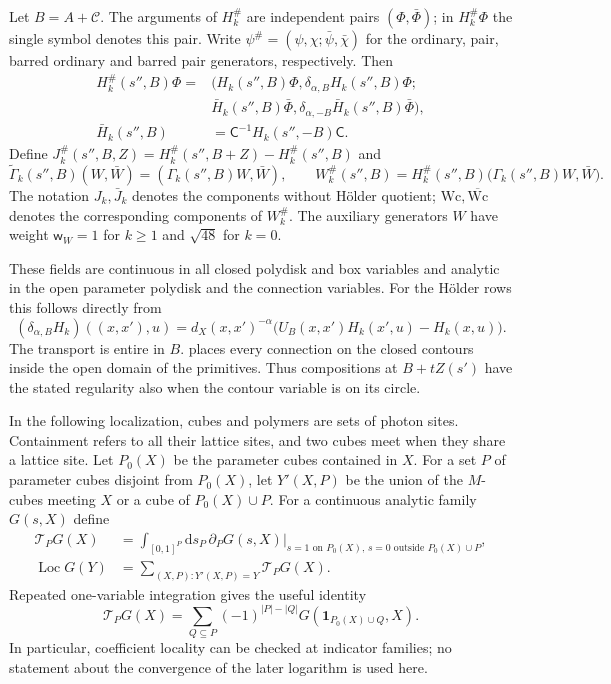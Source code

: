 \documentclass[11pt,letterpaper,reqno]{amsart}
\newcommand{\dd}{\mathrm d}
\begin{document}
Let $B=A+\mathscr C$.
The arguments of $H_k^\#$ are independent pairs
$(\Phi,\bar\Phi)$; in $H_k^\#\Phi$ the single symbol denotes
this pair. Write
$\psi^\#=(\psi,\chi;\bar\psi,\bar\chi)$ for the ordinary,
pair, barred ordinary and barred pair generators, respectively.
Then
\[
 \begin{aligned}
 H_k^\#(s'',B)\Phi
   ={}&(H_k(s'',B)\Phi,\delta_{\alpha,B}H_k(s'',B)\Phi;\\
       &
       \bar H_k(s'',B)\bar\Phi,
                       \delta_{\alpha,-B}\bar H_k(s'',B)\bar\Phi),\\
 \bar H_k(s'',B)&=\mathsf C^{-1}H_k(s'',-B)\mathsf C.
 \end{aligned}
\]
Define
$J_k^\#(s'',B,Z)=H_k^\#(s'',B+Z)-H_k^\#(s'',B)$ and
\[
 \widetilde\Gamma_k(s'',B)(W,\bar W)
                         =(\Gamma_k(s'',B)W,\bar W),\qquad
 W_k^\#(s'',B)=H_k^\#(s'',B)
                         \big(\Gamma_k(s'',B)W,\bar W\big).
\]
The notation $J_k,\bar J_k$ denotes the components without
H\"older quotient; $\mathrm{Wc},\overline{\mathrm{Wc}}$ denotes
the corresponding components of $W_k^\#$.
The auxiliary generators $W$ have weight
$\mathsf w_W=1$ for $k\ge1$ and $\sqrt{48}$ for $k=0$.

These fields are continuous in all closed polydisk and box
variables and analytic in the open parameter polydisk and the
connection variables. For the H\"older rows this follows
directly from
\[
 (\delta_{\alpha,B}H_k)((x,x'),u)
   =d_X(x,x')^{-\alpha}
       \big(U_B(x,x')H_k(x',u)-H_k(x,u)\big).
\]
The transport is entire in $B$. 
places every connection on the closed contours inside the
open domain of the primitives. Thus compositions at
$B+tZ(s')$ have the stated regularity also when the contour
variable is on its circle.

In the following localization, cubes and polymers are sets
of photon sites. Containment refers to all their lattice sites,
and two cubes meet when they share a lattice site.
Let $P_0(X)$ be the parameter cubes contained in $X$.
For a set $P$ of parameter cubes disjoint from $P_0(X)$, let $Y'(X,P)$ be the union of
the $M$-cubes meeting $X$ or a cube of $P_0(X)\cup P$.
For a continuous analytic family $G(s,X)$ define
\begin{align}
 \mathcal T_PG(X)
  &=\int_{[0,1]^P}\dd s_P\,
       \partial_PG(s,X)
       \big|_{s=1\text{ on }P_0(X),\,
                    s=0\text{ outside }P_0(X)\cup P},
                          \label{eq:rgnl-interpolation}\\
 \operatorname{Loc}G(Y)
  &=\sum_{(X,P):Y'(X,P)=Y}\mathcal T_PG(X).
                          \label{eq:rgnl-localization}
\end{align}
Repeated one-variable integration gives the useful identity
\begin{equation}\label{eq:rgnl-finite-difference}
 \mathcal T_PG(X)=
    \sum_{Q\subseteq P}(-1)^{|P|-|Q|}
                                 G(\mathbf1_{P_0(X)\cup Q},X).
\end{equation}
In particular, coefficient locality can be checked at
indicator families; no statement about the convergence of
the later logarithm is used here.
\end{document}
